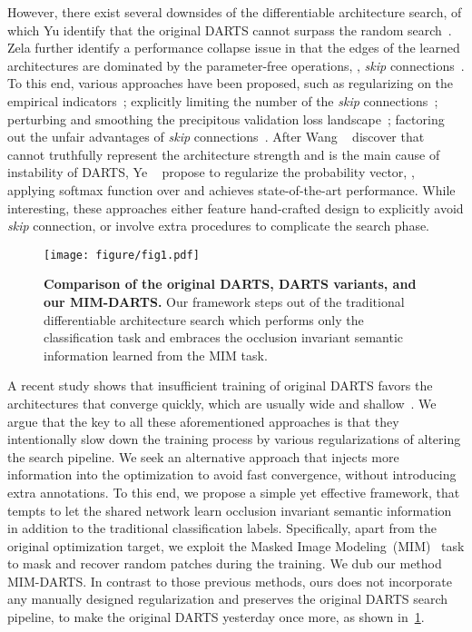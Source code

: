 \documentclass[10pt,twocolumn,letterpaper]{article}
\begin{document}
However, there exist several downsides of the differentiable architecture search, of which Yu \etal identify that the original DARTS cannot surpass the random search~\cite{Yu2020Evaluating}.
Zela \etal further identify a performance collapse issue in that the edges of the learned architectures are dominated by the parameter-free operations, \eg, \textit{skip} connections~\cite{Zela2020Understanding}. 
To this end, various approaches have been proposed, such as regularizing on the empirical indicators~\cite{Zela2020Understanding};
explicitly limiting the number of the \textit{skip} connections~\cite{Chen_2019_pdarts,liang2019darts+};
perturbing and smoothing the precipitous validation loss landscape~\cite{chen_2020_sdarts}; 
factoring out the unfair advantages of \textit{skip} connections~\cite{chu2021dartsminus,chu_2020_fairdarts}.
After Wang \etal ~\cite{wang_2021_rethinking} discover that  cannot truthfully represent the architecture strength and is the main cause of instability of DARTS,
Ye \etal~ propose to regularize the probability vector, \ie, applying softmax function over  
and achieves state-of-the-art performance.
While interesting, these approaches either feature 
hand-crafted design to explicitly avoid \textit{skip} connection, or involve extra 
procedures
to complicate the search phase.

\begin{figure}[t]
    \centering
     \texttt{[image: figure/fig1.pdf]}
     \vspace{-6pt}
     \caption{\textbf{Comparison of the original DARTS, DARTS variants, and our MIM-DARTS.}
     Our framework steps out of the traditional differentiable architecture search which performs only the classification task
     and embraces the occlusion invariant semantic information learned from the MIM task.
     }
     \label{fig:fig1}
     \vspace{-8pt}
  \end{figure}
   
A recent study shows that insufficient training of original DARTS favors the architectures that converge quickly, which are usually wide and shallow~\cite{shu_2020_understanding}. 
We argue that the key to all these 
aforementioned
approaches is that they intentionally slow down the training process by various regularizations of altering the search pipeline. 
We seek an alternative approach that injects more information into the optimization to avoid fast convergence, without introducing extra annotations. 
To this end, we propose a simple yet effective 
framework, that tempts to let the shared network learn occlusion invariant semantic information~\cite{Kong_2022_Occlusion} in addition to the traditional classification labels.
Specifically, apart from the original optimization target, we exploit the Masked Image Modeling~(MIM)~\cite{bao2022beit,He_2022_mae}
task to mask and recover random patches during the training. 
We dub our method MIM-DARTS. 
In contrast to those previous methods, ours does not incorporate any manually designed regularization and preserves the original DARTS search pipeline, to make the original  DARTS yesterday once more, as shown in~\cref{fig:fig1}.
\end{document}
